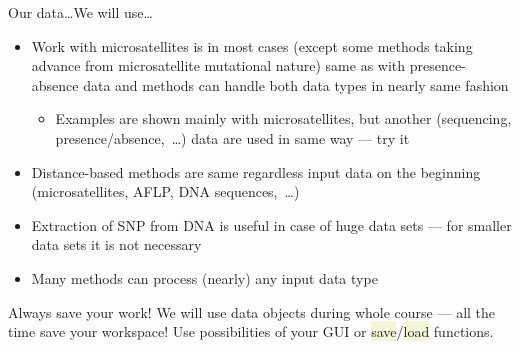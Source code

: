 \documentclass[compress, ucs, xelatex, 11pt, xcolor=svgnames, aspectratio=169,
	hyperref={
		bookmarks=true,
		unicode=true,
		colorlinks=true,
		pdftitle={Molecular data in R},
		plainpages=false,
		pdfauthor={Vojtech Zeisek},
		pdfsubject={Course about phylogeny and evolution in R},
		pdfcreator={XeLaTeX},
		pdfkeywords={R, evolution, phylogeny, molecular data},
		linkcolor=Crimson, %
		anchorcolor=Magenta, %
		citecolor=Magenta, %
		filecolor=Magenta, %
		menucolor=Magenta, %
		urlcolor=DodgerBlue, %
		pdftex},
	url={hyphens, lowtilde} %
	]{beamer}
\renewcommand{\texttt}[1]{\colorbox{Beige}{{\ttfamily #1}}}
\begin{document}
\begin{frame}[allowframebreaks]{Our data\ldots}{We will use\ldots}
\begin{itemize}
\begin{itemize}
				\item Morphological traits of Carnivora, \texttt{?ape::carnivora} --- life history patterns: allometric, phylogenetic and ecological associations
				\item Measurements of \textit{Iris setosa}, \textit{I. versicolor} and \textit{I. virginica}, \texttt{?iris} --- measurements of morphological characters, their correlations and differences among species
				\item Phylogeny and morphological traits of shorebirds, \texttt{?caper::shorebird} --- comparative evolution of characters
			\end{itemize}
		\item Work with microsatellites is in most cases (except some methods taking advance from microsatellite mutational nature) same as with presence-absence data and methods can handle both data types in nearly same fashion
		\begin{itemize}
			\item Examples are shown mainly with microsatellites, but another (sequencing, presence/absence,~\ldots) data are used in same way --- try it
		\end{itemize}
		\item Distance-based methods are same regardless input data on the beginning (microsatellites, AFLP, DNA sequences,~\ldots)
		\item Extraction of SNP from DNA is useful in case of huge data sets --- for smaller data sets it is not necessary
		\item Many methods can process (nearly) any input data type
	\end{itemize}
	\begin{alertblock}{Always save your work!}
		\alert{We will use data objects during whole course --- all the time save your workspace!} Use possibilities of your GUI or \texttt{save}/\texttt{load} functions.
	\end{alertblock}
\end{frame}
\end{document}
